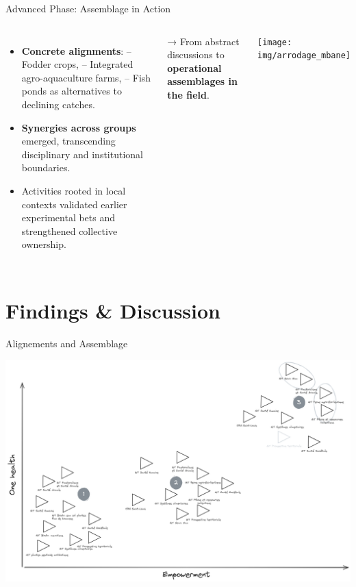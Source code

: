 \documentclass[newPxFont]{beamer}
\begin{document}
\begin{frame}[c]{Advanced Phase: Assemblage in Action}
  \vspace{-0.5cm}
  \begin{columns}[onlytextwidth,T]
    \column{\dimexpr\linewidth-30mm-5mm}

    \begin{itemize}
      \item \textbf{Concrete alignments}:  
            – Fodder crops,  
            – Integrated agro-aquaculture farms,  
            – Fish ponds as alternatives to declining catches.  
      \item \textbf{Synergies across groups} emerged, 
            transcending disciplinary and institutional boundaries.  
      \item Activities rooted in local contexts validated earlier 
            experimental bets and strengthened collective ownership.  
    \end{itemize}

    \vspace{0.3cm}
    → From abstract discussions to \textbf{operational assemblages in the field}.

    \column{30mm}
    \texttt{[image: img/arrodage\_mbane]}
  \end{columns}
\end{frame}

\section{Findings \& Discussion}

\begin{frame}[c]{Alignements and Assemblage}
  \begin{center}
    \includegraphics[width=\textwidth]{img/Drawing 2025-09-07 11.03.30.excalidraw}
  \end{center}
  
\end{frame}
\end{document}
